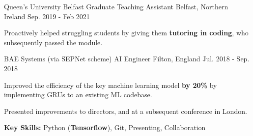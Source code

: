 \begin{cventries}
    
  \cventry
  	{Queen's University Belfast} %
    {Graduate Teaching Assistant} %
    {Belfast, Northern Ireland} %
    {Sep. 2019 - Feb 2021} %
    {
      \begin{cvitems} %
        \item {Proactively helped struggling students by giving them \textbf{tutoring in coding}, who subsequently passed the module.}
      \end{cvitems}
    }

  \cventry
  	{BAE Systems (via SEPNet scheme)} %
    {AI Engineer} %
    {Filton, England} %
    {Jul. 2018 - Sep. 2018} %
    {
      \begin{cvitems} %
        \item {Improved the efficiency of the key machine learning model \textbf{by 20\%} by implementing GRUs to an existing ML codebase.}
        \item {Presented improvements to directors, and at a subsequent conference in London.}
        \item {\textbf{Key Skills:} Python (\textbf{Tensorflow}), Git, Presenting, Collaboration}
      \end{cvitems}
    }


\end{cventries}


